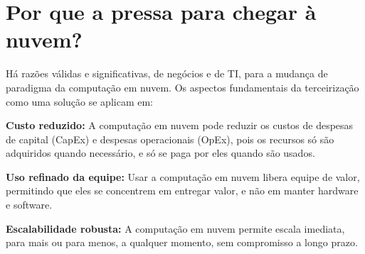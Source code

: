 \chapter{Por que a pressa para chegar à nuvem?}

Há razões válidas e significativas, de negócios e de TI, para a mudança de
paradigma da computação em nuvem. Os aspectos fundamentais da terceirização como
uma solução se aplicam em: 

\newcommand{\itemm}[1]{\item\textbf{#1}}

\begin{itemise}
    \itemm{Custo reduzido:} A computação em nuvem pode reduzir os custos de
        despesas de capital (CapEx) e despesas operacionais (OpEx), pois os recursos
        só são adquiridos quando necessário, e só se paga por eles quando são usados.

    \itemm{Uso refinado da equipe:} Usar a computação em nuvem libera equipe de
        valor, permitindo que eles se concentrem em entregar valor, e não em manter
        hardware e software.

    \itemm {Escalabilidade robusta:} A computação em nuvem permite escala imediata,
        para mais ou para menos, a qualquer momento, sem compromisso a longo prazo.
\end{itemise}

\undef\itemm
